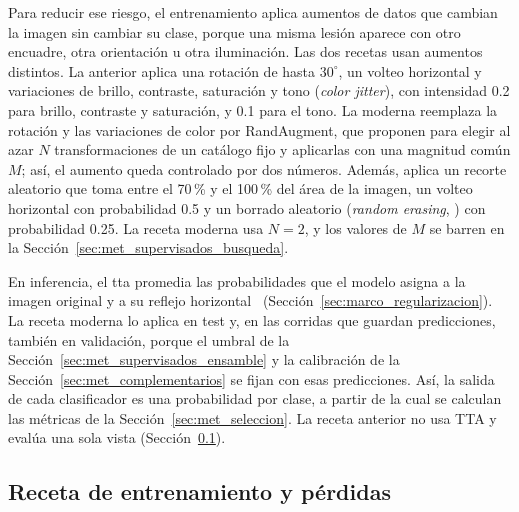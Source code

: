 Para reducir ese riesgo, el entrenamiento aplica aumentos de datos que cambian la imagen sin cambiar su clase, porque una
misma lesión aparece con otro encuadre, otra orientación u otra iluminación. Las dos recetas usan aumentos distintos. La
anterior aplica una rotación de hasta $30^\circ$, un volteo horizontal y variaciones de brillo, contraste, saturación y tono
(\emph{color jitter}), con intensidad 0.2 para brillo, contraste y saturación, y 0.1 para el tono. La moderna reemplaza la
rotación y las variaciones de color por RandAugment, que \textcite{cubuk2020randaugment} proponen para elegir al azar $N$
transformaciones de un catálogo fijo y aplicarlas con una magnitud común $M$; así, el aumento queda controlado por dos
números. Además, aplica un recorte aleatorio que toma entre el 70\,\% y el 100\,\% del área de la imagen, un volteo
horizontal con probabilidad 0.5 y un borrado aleatorio (\emph{random erasing}, \cite{zhong2020random}) con probabilidad
0.25. La receta moderna usa $N = 2$, y los valores de $M$ se barren en la Sección~\ref{sec:met_supervisados_busqueda}.

En inferencia, el \gls{tta} promedia las probabilidades que el modelo asigna a la imagen original y a su reflejo
horizontal~\cite{krizhevsky2012imagenet} (Sección~\ref{sec:marco_regularizacion}). La receta moderna lo aplica en test y,
en las corridas que guardan predicciones, también en validación, porque el umbral de la
Sección~\ref{sec:met_supervisados_ensamble} y la calibración de la Sección~\ref{sec:met_complementarios} se fijan con esas
predicciones. Así, la salida de cada clasificador es una probabilidad por clase, a partir de la cual se calculan las
métricas de la Sección~\ref{sec:met_seleccion}. La receta anterior no usa TTA y evalúa una sola vista
(Sección~\ref{sec:met_supervisados_receta}).

\subsection{Receta de entrenamiento y pérdidas}
\label{sec:met_supervisados_receta}

